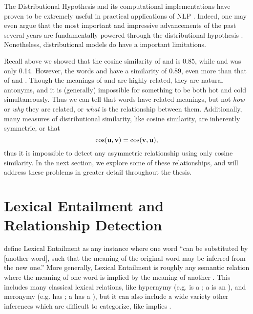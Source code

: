 The Distributional Hypothesis and its computational implementations have proven
to be extremely useful in practical applications of NLP \cite{cho:2015:arxiv,goldberg:2016:jair}. Indeed,
one may even argue that the most important and impressive advancements of
the past several years are fundamentally powered through the distributional
hypothesis \cite{manning:2015:cl}. Nonetheless, distributional models do have
a important limitations.

Recall above we showed that the cosine similarity of  and
 is $0.85$, while  and  was only 0.14.
However,  the words  and  have a similarity of $0.89$, even
more than that of  and . Though the meanings of
 and  are highly related, they are natural antonyms, and it
is (generally) impossible for something to be both hot and cold simultaneously.
Thus we can tell that words have related meanings, but not {\em how} or {\em
why} they are related, or {\em what} is the relationship between them.
Additionally, many measures of distributional similarity, like cosine similarity,
are inherently symmetric, or that
\begin{equation*}
  \text{cos}({\mathbf{u}}, {\mathbf{v}}) = \text{cos}({\mathbf{v}}, {\mathbf{u}}),
\end{equation*}
thus it is impossible to detect any asymmetric relationship using only cosine
similarity. In the next section, we explore some of these relationships, and
will address these problems in greater detail throughout the thesis.

\section{Lexical Entailment and Relationship Detection}

 define Lexical Entailment as any instance
where one word ``can be substituted by [another word], such that the meaning of
the original word may be inferred from the new one.'' More generally,
Lexical Entailment is roughly any semantic relation where
the meaning of one word is implied by the meaning of another
\cite{shnarch:2008:thesis}.
This includes many classical lexical relations, like hypernymy
(e.g.  is a ; a  is an ), and meronymy
(e.g.  has ; a  has a ), but it can also include a
wide variety other inferences which are difficult to categorize,
like  implies . 

